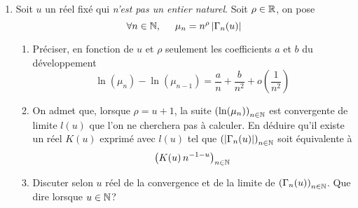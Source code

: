 \begin{enumerate}
\item Soit $u$ un réel fixé qui \emph{n'est pas un entier naturel}. Soit $\rho\in \mathbb{R}$, on pose
\begin{displaymath}
 \forall n\in \mathbb{N},\hspace{0.5cm} \mu_n = n^{\rho} \left|\Gamma_n(u)\right|
\end{displaymath}
\begin{enumerate}
 \item Préciser, en fonction de $u$ et $\rho$ seulement les coefficients $a$ et $b$ du développement
\begin{displaymath}
 \ln(\mu_n) - \ln(\mu_{n-1}) = \frac{a}{n} + \frac{b}{n^2} + o(\frac{1}{n^2})
\end{displaymath}
\item On admet que, lorsque $\rho = u+1$, la suite $\left( \ln(\mu_n)\right) _{n\in \mathbb{N}}$ est convergente de limite $l(u)$ que l'on ne cherchera pas à calculer. En déduire qu'il existe un réel $K(u)$ exprimé avec $l(u)$ tel que  $\left( \left|\Gamma_n(u)\right|\right)_{n\in \mathbb{N}}$ soit équivalente à
\begin{displaymath}
 \left( K(u)\, n^{-1-u}\right) _{n\in \mathbb{N}}
\end{displaymath}

\item Discuter selon $u$ réel de la convergence et de la limite de $\left( \Gamma_n(u)\right)_{n\in \mathbb{N}}$. Que dire lorsque $u\in \mathbb{N}$?
\end{enumerate}
\end{enumerate}

